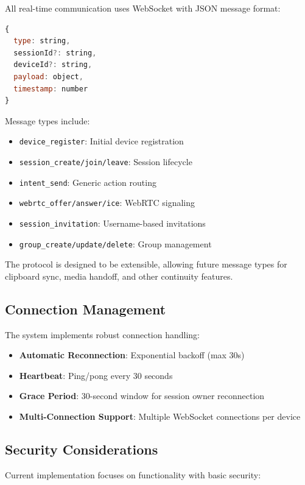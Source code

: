\documentclass[conference]{IEEEtran}
\begin{document}
All real-time communication uses WebSocket with JSON message format:

\begin{lstlisting}[language=JavaScript, basicstyle=\tiny]
{
  type: string,
  sessionId?: string,
  deviceId?: string,
  payload: object,
  timestamp: number
}
\end{lstlisting}

Message types include:
\begin{itemize}
    \item \texttt{device\_register}: Initial device registration
    \item \texttt{session\_create/join/leave}: Session lifecycle
    \item \texttt{intent\_send}: Generic action routing
    \item \texttt{webrtc\_offer/answer/ice}: WebRTC signaling
    \item \texttt{session\_invitation}: Username-based invitations
    \item \texttt{group\_create/update/delete}: Group management
\end{itemize}

The protocol is designed to be extensible, allowing future message types for clipboard sync, media handoff, and other continuity features.

\subsection{Connection Management}

The system implements robust connection handling:

\begin{itemize}
    \item \textbf{Automatic Reconnection}: Exponential backoff (max 30s)
    \item \textbf{Heartbeat}: Ping/pong every 30 seconds
    \item \textbf{Grace Period}: 30-second window for session owner reconnection
    \item \textbf{Multi-Connection Support}: Multiple WebSocket connections per device
\end{itemize}

\subsection{Security Considerations}

Current implementation focuses on functionality with basic security:
\end{document}
